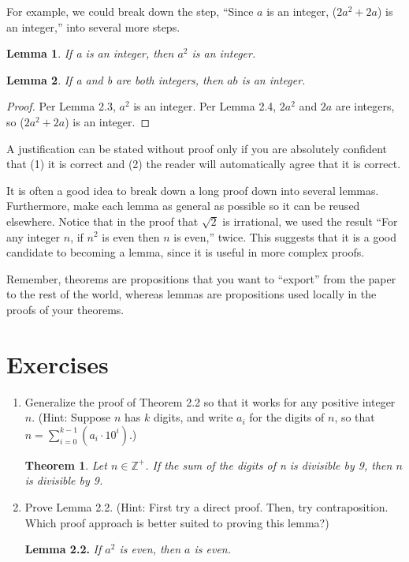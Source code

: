 \documentclass[12pt,a4paper]{article}
\newtheorem{theorem}{Theorem}[section]
\newtheorem{lemma}{Lemma}[section]
\theoremstyle{definition}
\begin{document}
For example, we could break down the step, ``Since $a$ is an integer, ($2a^2+2a$) is an integer,'' into several more steps.

\begin{lemma}
If a is an integer, then $a^2$ is an integer.
\end{lemma}

\begin{lemma}
If a and b are both integers, then $ab$ is an integer.
\end{lemma}

\begin{proof}
Per Lemma 2.3, $a^2$ is an integer. Per Lemma 2.4, $2a^2$ and $2a$ are integers, so ($2a^2+2a$) is an integer.
\end{proof}

A justification can be stated without proof only if you are absolutely confident that (1) it is correct and (2) the reader will automatically agree that it is correct.

\bigbreak

It is often a good idea to break down a long proof down into several lemmas. Furthermore, make each lemma as general as possible so it can be reused elsewhere. Notice that in the proof that $\sqrt{2}$ is irrational, we used the result ``For any integer $n$, if $n^2$ is even then $n$ is even,'' twice. This suggests that it is a good candidate to becoming a lemma, since it is useful in more complex proofs.

\bigbreak

Remember, theorems are propositions that you want to ``export'' from the paper to the rest of the world, whereas lemmas are propositions used locally in the proofs of your theorems.

\section*{Exercises}

\begin{enumerate}
\item Generalize the proof of Theorem 2.2 so that it works for any positive integer $n$. (Hint: Suppose $n$ has $k$ digits, and write $a_i$ for the digits of $n$, so that $n=\sum_{i=0}^{k-1}(a_i\cdot 10^i)$.)

\begin{theorem}
Let $n\in\mathbb{Z}^+$. If the sum of the digits of n is divisible by 9, then $n$ is divisible by 9.
\end{theorem}

\item Prove Lemma 2.2. (Hint: First try a direct proof. Then, try contraposition. Which proof approach is better suited to proving this lemma?)

\textbf{Lemma 2.2.} \textit{If $a^2$ is even, then $a$ is even.}

\end{enumerate}
\end{document}
